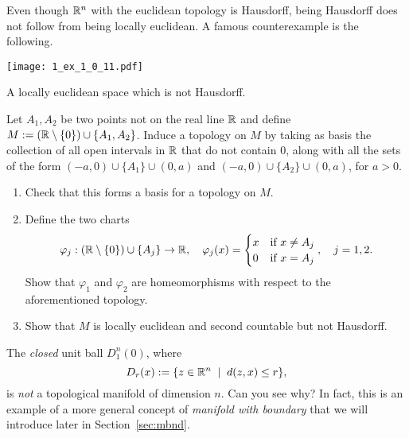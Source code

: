 \begin{exercise}\label{exe:line-two-origins}
	Even though $\mathbb{R}^n$ with the euclidean topology is Hausdorff, being Hausdorff does not follow from being locally euclidean. A famous counterexample is the following.
	\begin{marginfigure}
		\texttt{[image: 1\_ex\_1\_0\_11.pdf]}
		\label{fig:hausdorff-not-locally-euclidean}
		\caption{A locally euclidean space which is not Hausdorff.}
	\end{marginfigure}
	Let $A_1, A_2$ be two points not on the real line $\mathbb{R}$ and define $M:= (\mathbb{R}\setminus\{0\})\cup\{A_1,A_2\}$.
	Induce a topology on $M$ by taking as basis the collection of all open intervals in $\mathbb{R}$ that do not contain $0$, along with all the sets of the form $(-a, 0)\cup\{A_1\}\cup(0,a)$ and $(-a, 0)\cup\{A_2\}\cup(0,a)$, for $a>0$.
	\begin{enumerate}
		\item Check that this forms a basis for a topology on $M$.
		\item Define the two charts
		      \begin{equation}
			      \varphi_j:(\mathbb{R}\setminus\{0\})\cup\{A_j\} \to \mathbb{R}, \quad
			      \varphi_j(x) = \begin{cases} x &\mbox{if } x\neq A_j\\ 0 & \mbox{if } x = A_j \end{cases}, \quad
			      j = 1,2.
		      \end{equation}
		      Show that $\varphi_1$ and $\varphi_2$ are homeomorphisms with respect to the aforementioned topology.
		\item Show that $M$ is locally euclidean and second countable but not Hausdorff.
	\end{enumerate}
\end{exercise}

\begin{example}\label{ex:uball}
	The \emph{closed} unit ball $D_1^n(0)$, where
	\begin{equation}
		D_r(x) := \{z\in\mathbb{R}^n \;\mid\; d(z,x) \leq r\},
	\end{equation}
	is \emph{not} a topological manifold of dimension $n$. Can you see why? In fact, this is an example of a more general concept of \emph{manifold with boundary} that we will introduce later in Section~\ref{sec:mbnd}.
\end{example}

